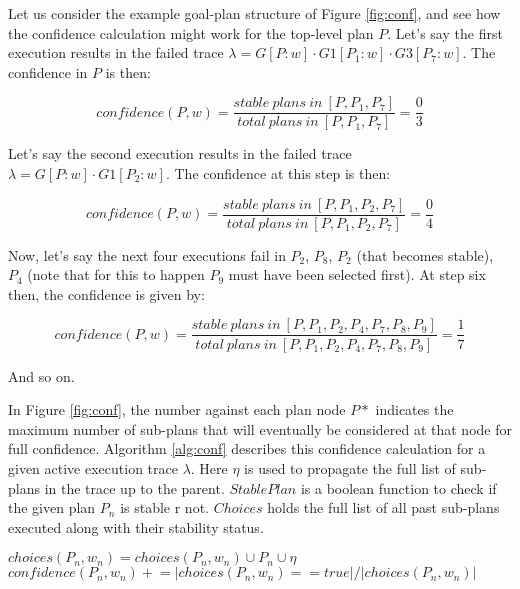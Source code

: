 \documentclass[a4paper]{article}
\begin{document}
Let us consider the example goal-plan structure of Figure \ref{fig:conf}, and see how the confidence calculation might work for the top-level plan $P$. Let's say the first execution results in the failed trace $\lambda=G[P:w] \cdot G1[P_1:w] \cdot G3[P_7:w]$. The confidence in $P$ is then:

\begin{equation}
confidence(P,w)=\frac{stable~plans~in~[P,P_1,P_7]}{total~plans~in~[P,P_1,P_7]} = \frac{0}{3}
\end{equation}

Let's say the second execution results in the failed trace $\lambda=G[P:w] \cdot G1[P_2:w]$. The confidence at this step is then:

\begin{equation}
confidence(P,w)=\frac{stable~plans~in~[P,P_1,P_2,P_7]}{total~plans~in~[P,P_1,P_2,P_7]} = \frac{0}{4}
\end{equation}

Now, let's say the next four executions fail in $P_2$, $P_8$, $P_2$ (that becomes stable), $P_4$ (note that for this to happen $P_9$ must have been selected first). At step six then, the confidence is given by:

\begin{equation}
confidence(P,w)=\frac{stable~plans~in~[P,P_1,P_2,P_4,P_7,P_8,P_9]}{total~plans~in~[P,P_1,P_2,P_4,P_7,P_8,P_9]} = \frac{1}{7}
\label{eqn:conf3}
\end{equation}

And so on. 

In Figure \ref{fig:conf}, the number against each plan node $P*$ indicates the maximum number of sub-plans that will eventually be considered at that node for full confidence. Algorithm \ref{alg:conf} describes this confidence calculation for a given active execution trace $\lambda$. Here $\eta$ is used to propagate the full list of sub-plans in the trace up to the parent. $StablePlan$ is a boolean function to check if the given plan $P_n$ is stable r not. $Choices$ holds the full list of all past sub-plans executed along with their stability status.

\begin{algorithm}[ht]
$choices(P_n,w_n) = choices(P_n,w_n) \cup P_n \cup \eta$\;
$confidence(P_n,w_n) +\!\!= |choices(P_n,w_n) == true|/|choices(P_n,w_n)|$\;
\caption{$UpdateConfidence(\lambda, \eta, k, \epsilon)$}
\label{alg:conf}
\end{algorithm}
\end{document}
